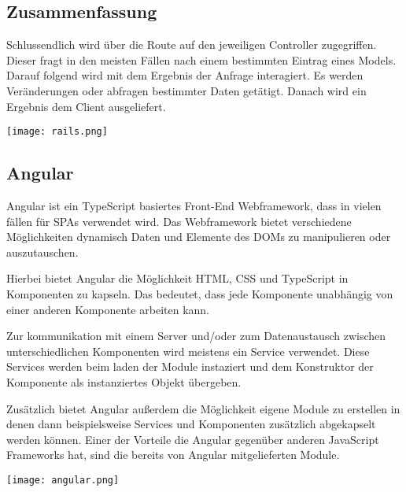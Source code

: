 \documentclass[11pt]{article}
\begin{document}
\begin{flushleft}
			\subsection{Zusammenfassung}
			\label{sec: rails_resuemee}
			Schlussendlich wird über die Route auf den jeweiligen Controller zugegriffen. Dieser fragt in den meisten Fällen nach einem bestimmten Eintrag eines Models. Darauf folgend wird mit dem Ergebnis der Anfrage interagiert. Es werden Veränderungen oder abfragen bestimmter Daten getätigt. Danach wird ein Ergebnis dem Client ausgeliefert.
			
			
			
			
			
			
			\begin{center}
				\texttt{[image: rails.png]}
			\end{center}
			
			\subsection{Angular}
			\label{sec: angular}
			Angular ist ein TypeScript basiertes Front-End Webframework, dass in vielen fällen für SPAs verwendet wird. Das Webframework bietet verschiedene Möglichkeiten dynamisch Daten und Elemente des DOMs zu manipulieren oder auszutauschen.\par\bigskip 
			
			Hierbei bietet Angular die Möglichkeit HTML, CSS und TypeScript in Komponenten zu kapseln. Das bedeutet, dass jede Komponente unabhängig von einer anderen Komponente arbeiten kann.\par\bigskip
			
			Zur kommunikation mit einem Server und/oder zum Datenaustausch zwischen unterschiedlichen Komponenten wird meistens ein Service verwendet. Diese Services werden beim laden der Module instaziert und dem Konstruktor der Komponente als instanziertes Objekt übergeben.\par\bigskip
			
			Zusätzlich bietet Angular außerdem die Möglichkeit eigene Module zu erstellen in denen dann beispielsweise Services und Komponenten zusätzlich abgekapselt werden können. Einer der Vorteile die Angular gegenüber anderen JavaScript Frameworks hat, sind die bereits von Angular mitgelieferten Module. 
			
			\begin{center}
				\texttt{[image: angular.png]}
			\end{center}
		

\end{flushleft}
\end{document}
